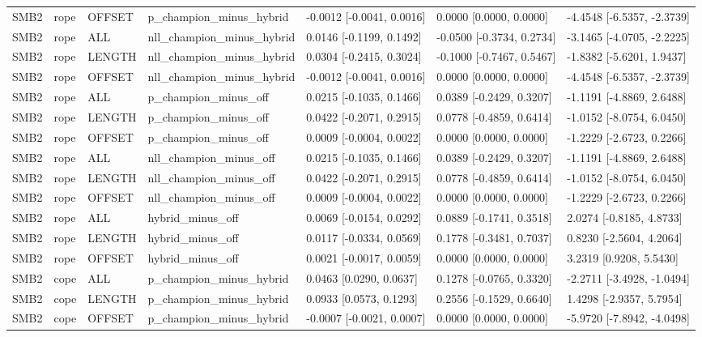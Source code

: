 \begin{tabular}{lllllll}
SMB2 & rope & OFFSET & p\_champion\_minus\_hybrid & -0.0012 [-0.0041, 0.0016] & 0.0000 [0.0000, 0.0000] & -4.4548 [-6.5357, -2.3739] \\
SMB2 & rope & ALL & nll\_champion\_minus\_hybrid & 0.0146 [-0.1199, 0.1492] & -0.0500 [-0.3734, 0.2734] & -3.1465 [-4.0705, -2.2225] \\
SMB2 & rope & LENGTH & nll\_champion\_minus\_hybrid & 0.0304 [-0.2415, 0.3024] & -0.1000 [-0.7467, 0.5467] & -1.8382 [-5.6201, 1.9437] \\
SMB2 & rope & OFFSET & nll\_champion\_minus\_hybrid & -0.0012 [-0.0041, 0.0016] & 0.0000 [0.0000, 0.0000] & -4.4548 [-6.5357, -2.3739] \\
SMB2 & rope & ALL & p\_champion\_minus\_off & 0.0215 [-0.1035, 0.1466] & 0.0389 [-0.2429, 0.3207] & -1.1191 [-4.8869, 2.6488] \\
SMB2 & rope & LENGTH & p\_champion\_minus\_off & 0.0422 [-0.2071, 0.2915] & 0.0778 [-0.4859, 0.6414] & -1.0152 [-8.0754, 6.0450] \\
SMB2 & rope & OFFSET & p\_champion\_minus\_off & 0.0009 [-0.0004, 0.0022] & 0.0000 [0.0000, 0.0000] & -1.2229 [-2.6723, 0.2266] \\
SMB2 & rope & ALL & nll\_champion\_minus\_off & 0.0215 [-0.1035, 0.1466] & 0.0389 [-0.2429, 0.3207] & -1.1191 [-4.8869, 2.6488] \\
SMB2 & rope & LENGTH & nll\_champion\_minus\_off & 0.0422 [-0.2071, 0.2915] & 0.0778 [-0.4859, 0.6414] & -1.0152 [-8.0754, 6.0450] \\
SMB2 & rope & OFFSET & nll\_champion\_minus\_off & 0.0009 [-0.0004, 0.0022] & 0.0000 [0.0000, 0.0000] & -1.2229 [-2.6723, 0.2266] \\
SMB2 & rope & ALL & hybrid\_minus\_off & 0.0069 [-0.0154, 0.0292] & 0.0889 [-0.1741, 0.3518] & 2.0274 [-0.8185, 4.8733] \\
SMB2 & rope & LENGTH & hybrid\_minus\_off & 0.0117 [-0.0334, 0.0569] & 0.1778 [-0.3481, 0.7037] & 0.8230 [-2.5604, 4.2064] \\
SMB2 & rope & OFFSET & hybrid\_minus\_off & 0.0021 [-0.0017, 0.0059] & 0.0000 [0.0000, 0.0000] & 3.2319 [0.9208, 5.5430] \\
SMB2 & cope & ALL & p\_champion\_minus\_hybrid & 0.0463 [0.0290, 0.0637] & 0.1278 [-0.0765, 0.3320] & -2.2711 [-3.4928, -1.0494] \\
SMB2 & cope & LENGTH & p\_champion\_minus\_hybrid & 0.0933 [0.0573, 0.1293] & 0.2556 [-0.1529, 0.6640] & 1.4298 [-2.9357, 5.7954] \\
SMB2 & cope & OFFSET & p\_champion\_minus\_hybrid & -0.0007 [-0.0021, 0.0007] & 0.0000 [0.0000, 0.0000] & -5.9720 [-7.8942, -4.0498] \\

\end{tabular}
